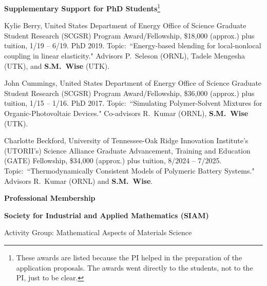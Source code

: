 \documentclass[11pt]{letter}
\begin{document}
	\smallskip
	
{\LARGE\bf Supplementary Support for PhD Students}\footnote{These awards are listed because the PI helped in the preparation of the application proposals. The awards went directly to the students, not to the PI, just to be clear.}

	\smallskip
	

    \begin{description}    
    \item
Kylie Berry, United States Department of Energy Office of Science Graduate Student Research (SCGSR) Program Award/Fellowship, \$18,000 (approx.) plus tuition, 1/19 -- 6/19. PhD 2019.  Topic:~``Energy-based blending for local-nonlocal coupling in linear elasticity." Advisors P.~Seleson (ORNL), Tadele Mengesha (UTK), and \textbf{S.M.~Wise} (UTK).
    \item
John Cummings, United States Department of Energy Office of Science Graduate Student Research (SCGSR) Program Award/Fellowship, \$36,000 (approx.) plus tuition, 1/15 -- 1/16. PhD 2017.  Topic:~``Simulating Polymer-Solvent Mixtures for Organic-Photovoltaic Devices." Co-advisors R.~Kumar (ORNL), \textbf{S.M.~Wise} (UTK).
	\item
Charlotte Beckford, University of Tennessee-Oak Ridge Innovation Institute's (UTORII's) Science Alliance Graduate Advancement, Training and Education (GATE) Fellowship, \$34,000 (approx.) plus tuition, 8/2024 -- 7/2025. Topic:~``Thermodynamically Consistent Models of Polymeric Battery Systems." Advisors R.~Kumar (ORNL) and \textbf{S.M.~Wise}.
	\end{description}
  
{\LARGE\bf  Professional Membership}
    \begin{description}
    \item
 \textbf{Society for Industrial and Applied Mathematics (SIAM)}
    \begin{description}
    \item
Activity Group: Mathematical Aspects of Materials Science
    \end{description}
    \end{description}
	
	\smallskip
\end{document}

